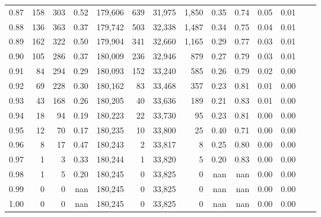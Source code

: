 \begin{tabular}{rrrrrrrrrrrrrr}
0.87 &    158 &  303 &    0.52 &  179,606 &      639 &  31,975 &   1,850 &  0.35 &  0.74 &  0.05 &      0.01 \\
0.88 &    136 &  363 &    0.37 &  179,742 &      503 &  32,338 &   1,487 &  0.34 &  0.75 &  0.04 &      0.01 \\
0.89 &    162 &  322 &    0.50 &  179,904 &      341 &  32,660 &   1,165 &  0.29 &  0.77 &  0.03 &      0.01 \\
0.90 &    105 &  286 &    0.37 &  180,009 &      236 &  32,946 &     879 &  0.27 &  0.79 &  0.03 &      0.01 \\
0.91 &     84 &  294 &    0.29 &  180,093 &      152 &  33,240 &     585 &  0.26 &  0.79 &  0.02 &      0.00 \\
0.92 &     69 &  228 &    0.30 &  180,162 &       83 &  33,468 &     357 &  0.23 &  0.81 &  0.01 &      0.00 \\
0.93 &     43 &  168 &    0.26 &  180,205 &       40 &  33,636 &     189 &  0.21 &  0.83 &  0.01 &      0.00 \\
0.94 &     18 &   94 &    0.19 &  180,223 &       22 &  33,730 &      95 &  0.23 &  0.81 &  0.00 &      0.00 \\
0.95 &     12 &   70 &    0.17 &  180,235 &       10 &  33,800 &      25 &  0.40 &  0.71 &  0.00 &      0.00 \\
0.96 &      8 &   17 &    0.47 &  180,243 &        2 &  33,817 &       8 &  0.25 &  0.80 &  0.00 &      0.00 \\
0.97 &      1 &    3 &    0.33 &  180,244 &        1 &  33,820 &       5 &  0.20 &  0.83 &  0.00 &      0.00 \\
0.98 &      1 &    5 &    0.20 &  180,245 &        0 &  33,825 &       0 &   nan &   nan &  0.00 &      0.00 \\
0.99 &      0 &    0 &     nan &  180,245 &        0 &  33,825 &       0 &   nan &   nan &  0.00 &      0.00 \\
1.00 &      0 &    0 &     nan &  180,245 &        0 &  33,825 &       0 &   nan &   nan &  0.00 &      0.00 \\
\bottomrule
\end{tabular}
